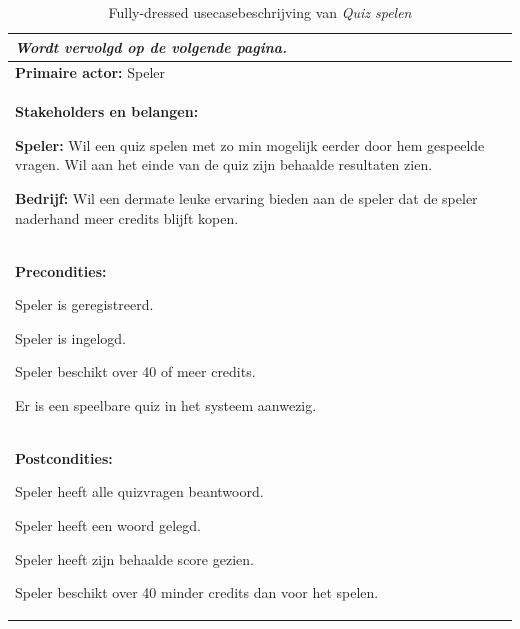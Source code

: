 \begin{xltabular}{\textwidth}{ X }
   \caption{Fully-dressed usecasebeschrijving van \textit{Quiz spelen}} \label{tab:usecasequizspelen} \\ \hline \endfirsthead\endhead
   \hspace*{\fill}\textit{Wordt vervolgd op de volgende pagina.} \\ \hline \endfoot\endlastfoot

   \textbf{Primaire actor:} Speler                  \\

   \hline

   \begin{minipage}[t]{\linewidth}
      \textbf{Stakeholders en belangen:}
      \begin{smallitemize}
         \item \textbf{Speler:} Wil een quiz spelen met zo min mogelijk eerder door hem gespeelde vragen. Wil aan het einde van de quiz zijn behaalde resultaten zien.
         \item \textbf{Bedrijf:} Wil een dermate leuke ervaring bieden aan de speler dat de speler naderhand meer credits blijft kopen.
      \end{smallitemize}
   \end{minipage} \\

   \hline

   \begin{minipage}[t]{\linewidth}
      \textbf{Precondities:}
      \begin{smallitemize}
         \item Speler is geregistreerd.
         \item Speler is ingelogd.
         \item Speler beschikt over 40 of meer credits.
         \item Er is een speelbare quiz in het systeem aanwezig.
      \end{smallitemize}
   \end{minipage} \\

   \hline

   \begin{minipage}[t]{\linewidth}
      \textbf{Postcondities:}
      \begin{smallitemize}
         \item Speler heeft alle quizvragen beantwoord.
         \item Speler heeft een woord gelegd.
         \item Speler heeft zijn behaalde score gezien.
         \item Speler beschikt over 40 minder credits dan voor het spelen.
      \end{smallitemize}
   \end{minipage} \\


\end{xltabular}
